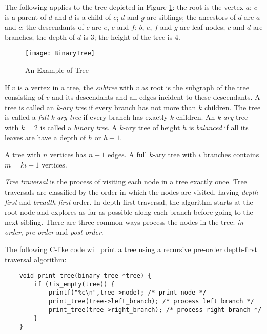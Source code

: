 \begin{example}
The following applies to the tree depicted in Figure \ref{fig:BinaryTree-Example}: the root is the vertex $a$; $c$ is a parent of $d$ and $d$ is a child of $c$; $d$ and $g$ are siblings; the ancestors of $d$ are $a$ and $c$; the descendants of $c$ are $e$, $e$ and $f$; $b$, $e$, $f$ and $g$ are leaf nodes; $c$ and $d$ are branches; the depth of $d$ is 3; the height of the tree is 4.
\end{example}

\begin{figure}[h]
\centering\texttt{[image: BinaryTree]}
\caption{\label{fig:BinaryTree-Example}An Example of Tree}
\end{figure}

If $v$ is a vertex in a tree, the \emph{subtree} with $v$ as root is the subgraph of the tree consisting of $v$ and its descendants and all edges incident to these descendants. A tree is called an \emph{k-ary tree} if every branch has not more than $k$ children. The tree is called a \emph{full k-ary tree} if every branch has exactly $k$ children. An \emph{k-ary} tree with $k=2$ is called a \emph{binary tree}. A $k$-ary tree of height $h$ is \emph{balanced} if all its leaves are have a depth of $h$ or $h-1$.

\begin{example}
A tree with $n$ vertices has $n-1$ edges. A full $k$-ary tree with $i$ branches contains $m=ki+1$ vertices.
\end{example}

\emph{Tree traversal} is the process of visiting each node in a tree exactly once. Tree traversals are classified by the order in which the nodes are visited, having \emph{depth-first} and \emph{breadth-first} order. In depth-first traversal, the algorithm starts at the root node and explores as far as possible along each branch before going to the next sibling. There are three common ways process the nodes in the tree: \emph{in-order}, \emph{pre-order} and \emph{post-order}.

The following C-like code will print a tree using a recursive pre-order depth-first traversal algorithm:

\begin{verbatim}
    void print_tree(binary_tree *tree) {
        if (!is_empty(tree)) {
            printf("%c\n",tree->node); /* print node */
            print_tree(tree->left_branch); /* process left branch */
            print_tree(tree->right_branch); /* process right branch */
        }
    }
\end{verbatim}

